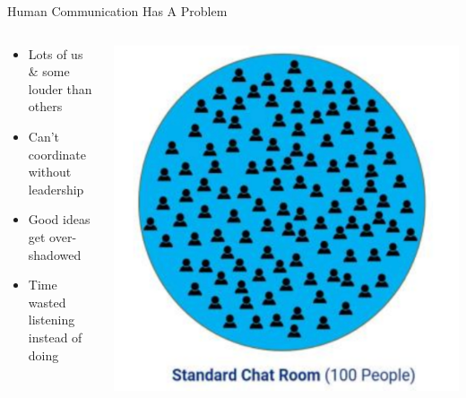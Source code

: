 \documentclass[aspectratio=169]{beamer}
\begin{document}
\begin{frame}{Human Communication Has A Problem}
\begin{columns}[T]
    \begin{column}[T]{0.5\textwidth}
        \begin{itemize}
            \item Lots of us \& some louder than others
            \item Can't coordinate without leadership
            \item Good ideas get over-shadowed
            \item Time wasted listening instead of doing
        \end{itemize}
    \end{column}
    \begin{column}{0.5\textwidth}
        \includegraphics[height=0.8\textheight]{imgs/CSI_section/standard_chat_room.png}
    \end{column}
\end{columns}
\end{frame}
\end{document}
